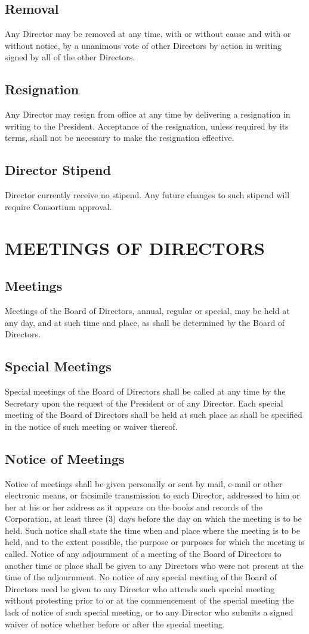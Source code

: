 \documentclass{article}
\begin{document}
\subsection{Removal}
Any Director may be removed at any time, with or without cause and with or without notice, by a unanimous vote of other Directors by action in writing signed by all of the other Directors.
\subsection{Resignation}
Any Director may resign from office at any time by delivering a resignation in writing to the President.  Acceptance of the resignation, unless required by its terms, shall not be necessary to make the resignation effective.
\subsection{Director Stipend}
Director currently receive no stipend. Any future changes to such stipend will require Consortium approval.
\section{MEETINGS OF DIRECTORS}
\subsection{Meetings}
Meetings of the Board of Directors, annual, regular or special, may be held at any day, and at such time and place, as shall be determined by the Board of Directors.
\subsection{Special Meetings}
Special meetings of the Board of Directors shall be called at any time by the Secretary upon the request of the President or of any Director.  Each special meeting of the Board of Directors shall be held at such place as shall be specified in the notice of such meeting or waiver thereof.
\subsection{Notice of Meetings}
Notice of meetings shall be given personally or sent by mail, e-mail or other electronic means, or facsimile transmission to each Director, addressed to him or her at his or her address as it appears on the books and records of the Corporation, at least three (3) days before the day on which the meeting is to be held.  Such notice shall state the time when and place where the meeting is to be held, and to the extent possible, the purpose or purposes for which the meeting is called.  Notice of any adjournment of a meeting of the Board of Directors to another time or place shall be given to any Directors who were not present at the time of the adjournment.  No notice of any special meeting of the Board of Directors need be given to any Director who attends such special meeting without protesting prior to or at the commencement of the special meeting the lack of notice of such special meeting, or to any Director who submits a signed waiver of notice whether before or after the special meeting.
\end{document}
